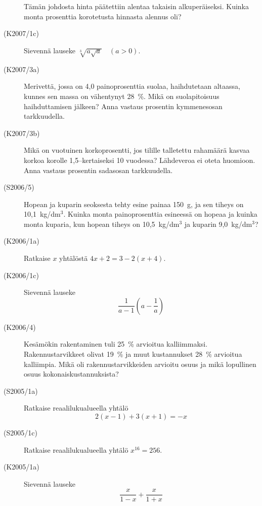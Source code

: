 \begin{description}
                        Tämän johdosta hinta päätettiin alentaa takaisin alkuperäiseksi.
                        Kuinka monta prosenttia korotetusta hinnasta alennus oli?
    \item[(K2007/1c)]  Sievennä lauseke $ \sqrt[3]{a \sqrt{a}} \quad (a > 0) $.
    \item[(K2007/3a)]  Merivettä, jossa on 4,0 painoprosenttia suolaa, haihdutetaan
                        altaassa, kunnes sen massa on vähentynyt 28~\%. Mikä on
                        suolapitoisuus haihduttamisen jälkeen? Anna vastaus prosentin
                        kymmenesosan tarkkuudella. 
    \item[(K2007/3b)]  Mikä on vuotuinen korkoprosentti, jos tilille talletettu rahamäärä
                        kasvaa korkoa korolle 1,5--kertaiseksi 10 vuodessa? Lähdeveroa
                        ei oteta huomioon. Anna vastaus prosentin sadasosan 
                        tarkkuudella.
        \item[(S2006/5)]   Hopean ja kuparin seoksesta tehty esine painaa 150~g, ja sen
                       tiheys on 10,1~kg/dm\(^3\). Kuinka monta painoprosenttia 
                        esineessä on hopeaa ja kuinka monta kuparia, kun hopean tiheys on 
                        10,5~kg/dm\(^3\) ja kuparin 9,0~kg/dm\(^3\)?
    \item[(K2006/1a)]  Ratkaise $x$ yhtälöstä $4x + 2 =  3 - 2(x + 4)$.
    \item[(K2006/1c)]  Sievennä lauseke 
                        \[ \frac{1}{a - 1} \left( a - \frac{1}{a} \right) \]
     \item[(K2006/4)]   Kesämökin rakentaminen tuli 25~\% arvioitua kalliimmaksi.
 Rakennustarvikkeet olivat 19~\% ja muut kustannukset 28~\% 
                        arvioitua kalliimpia. Mikä oli rakennustarvikkeiden arvioitu osuus ja 
                        mikä lopullinen osuus kokonaiskustannuksista?
    \item[(S2005/1a)]  Ratkaise reaalilukualueella yhtälö 
                        \[ 2(x - 1) + 3(x + 1 ) = -x \]
    \item[(S2005/1c)]  Ratkaise reaalilukualueella yhtälö $ x^{16} = 256 $.
    \item[(K2005/1a)]  Sievennä lauseke
                        \[ \frac{x}{1 - x} + \frac{x}{1 + x} \]

\end{description}
